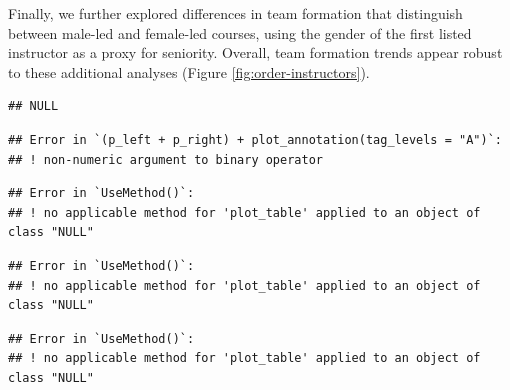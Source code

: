 \documentclass[
  11pt,
]{article}
\begin{document}
Finally, we further explored differences in team formation that distinguish between male-led and female-led courses, using the gender of the first listed instructor as a proxy for seniority. Overall, team formation trends appear robust to these additional analyses (Figure \ref{fig:order-instructors}).

\begin{verbatim}
## NULL
\end{verbatim}

\begin{verbatim}
## Error in `(p_left + p_right) + plot_annotation(tag_levels = "A")`:
## ! non-numeric argument to binary operator
\end{verbatim}

\begin{verbatim}
## Error in `UseMethod()`:
## ! no applicable method for 'plot_table' applied to an object of class "NULL"
\end{verbatim}

\begin{verbatim}
## Error in `UseMethod()`:
## ! no applicable method for 'plot_table' applied to an object of class "NULL"
\end{verbatim}

\begin{verbatim}
## Error in `UseMethod()`:
## ! no applicable method for 'plot_table' applied to an object of class "NULL"
\end{verbatim}
\end{document}

